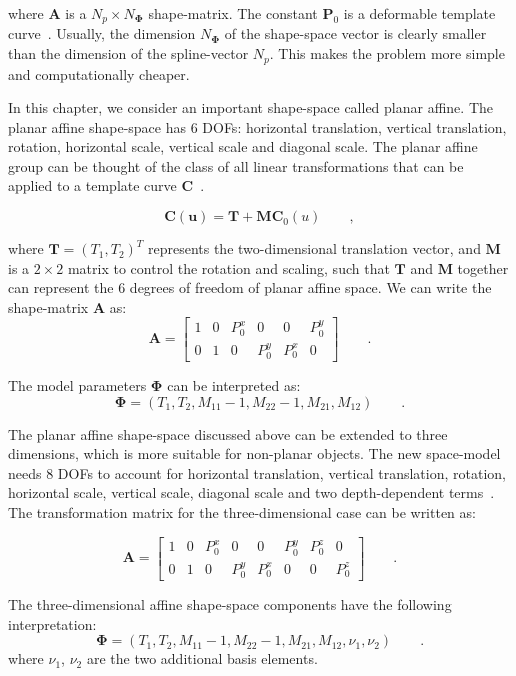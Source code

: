 where $\mathbf{A}$ is a $N_p \times N_{\mathbf{\Phi}}$ shape-matrix. The
constant  $\mathbf{P}_0$ is a deformable template curve~\cite{blake1998active}. Usually, the
dimension $N_{\mathbf{\Phi}}$ of the shape-space vector is clearly
smaller than the dimension of the spline-vector $N_p$. This makes the
problem more simple and computationally cheaper.

In this chapter, we consider an important shape-space called planar
affine. The planar affine shape-space has 6 DOFs: horizontal
translation, vertical translation, rotation, horizontal scale,
vertical scale and diagonal scale. The planar affine group can be
thought of the class of all linear transformations that can be applied
to a template curve $\mathbf{C}$~\cite{blake1998active}. 

\begin{equation}
  \label{eq:4.17}
  \mathbf{C(u)} = \mathbf{T} + \mathbf{M} \mathbf{C}_0(u)\qquad,
\end{equation}

where $\mathbf{T} = (T_1, T_2)^T$ represents the two-dimensional translation
vector, and $\mathbf{M}$ is a $2 \times 2$ matrix to control the rotation and
scaling, such that $\mathbf{T}$ and $\mathbf{M}$ together can represent the 6 degrees of
freedom of planar affine space. We can write the shape-matrix $\mathbf{A}$
as:
\begin{equation}
  \label{eq:4.18}
\mathbf{A} =
  \begin{bmatrix}
    1 & 0 & P_0^x & 0 & 0 & P_0^y\\
    0 & 1 & 0 & P_0^y & P_0^x & 0
  \end{bmatrix}\qquad. 
\end{equation}

The model parameters $\mathbf{\Phi}$ can be interpreted as:
\begin{equation}
  \label{eq:4.19}
  \mathbf{\Phi} =  (T_1, T_2, M_{11} - 1, M_{22} - 1, M_{21}, M_{12})\qquad.
\end{equation}

The planar affine shape-space discussed above can be extended to
three dimensions, which is more suitable for
non-planar objects. The new space-model needs 8 DOFs to
account for horizontal
translation, vertical translation, rotation, horizontal scale,
vertical scale, diagonal scale and two depth-dependent terms~\cite{blake1998active}. The transformation matrix for the three-dimensional case
can be written as:

\begin{equation}
  \label{eq:4.20}
\mathbf{A} =
  \begin{bmatrix}
    1 & 0 & P_0^x & 0 & 0 & P_0^y & P_0^z & 0\\
    0 & 1 & 0 & P_0^y & P_0^x & 0 & 0 & P_0^z
  \end{bmatrix} \qquad.
\end{equation}

The three-dimensional affine shape-space components have
the following interpretation:
\begin{equation}
  \label{eq:4.19}
  \mathbf{\Phi} =  (T_1, T_2, M_{11} - 1, M_{22} - 1, M_{21}, M_{12},
  \nu_1, \nu_2) \qquad.
\end{equation}
where $\nu_1$, $\nu_2$ are the two additional basis elements.

